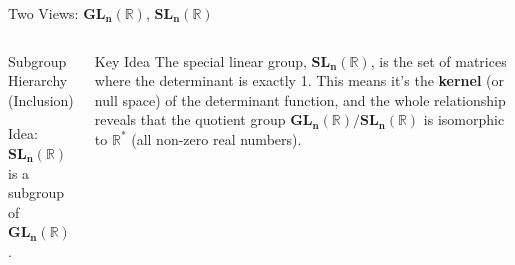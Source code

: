 \documentclass[11pt,aspectratio=43,ignorenonframetext,t]{beamer}
\begin{document}
\begin{frame}{Two Views: $\mathbf{GL_n(\mathbb{R})}$, $\mathbf{SL_n(\mathbb{R})}$}
\vspace{-0.3cm}
\centering
\begin{columns}
\vspace{-0.3cm}
\begin{block}{Subgroup Hierarchy (Inclusion)}
\begin{center}
\end{center}
\vspace*{0.5em}
\alert{Idea:} $\mathbf{SL_n(\mathbb{R})}$ is a subgroup of $\mathbf{GL_n(\mathbb{R})}$.
\end{block}

\vspace{-0.3cm}

\begin{alertblock}{Key Idea}
The special linear group, $\mathbf{SL_n(\mathbb{R})}$, is the set of matrices where the determinant is exactly 1. This means it's the \textbf{kernel} (or null space) of the determinant function, and the whole relationship reveals that the quotient group $\mathbf{GL_n(\mathbb{R})} / \mathbf{SL_n(\mathbb{R})}$ is isomorphic to $\mathbf{\mathbb{R}^*}$ (all non-zero real numbers).
\end{alertblock}
\end{columns}

\end{frame}
\end{document}
